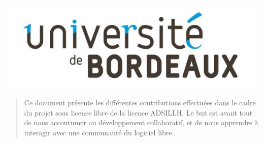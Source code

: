 \documentclass[12pt]{report}
\begin{document}
\begin{titlepage}
  \vspace{-0.1cm}
  \centering\includegraphics[scale=0.3]{images/logo_univ.jpg}
  
\end{titlepage}
\makeatother



\begin{abstract}
Ce document présente les différentes contributions effectuées dans le
cadre du projet sous licence libre de la licence ADSILLH. Le but est
avant tout de nous accoutumer au développement collaboratif, et de
nous apprendre à interagir avec une communauté du logiciel libre.
\end{abstract}

\tableofcontents


\end{document}
